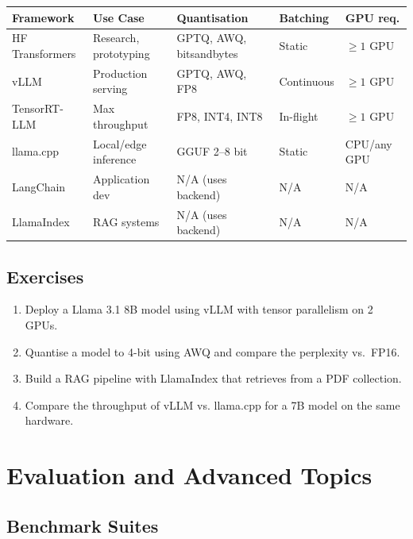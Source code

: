 \documentclass[11pt,a4paper]{book}
\theoremstyle{definition}
\begin{document}
\begin{longtable}{p{3cm}p{3cm}p{3cm}p{3cm}p{3cm}}
	\toprule
	\textbf{Framework} & \textbf{Use Case}     & \textbf{Quantisation}   & \textbf{Batching} & \textbf{GPU req.} \\
	\midrule
	HF Transformers    & Research, prototyping & GPTQ, AWQ, bitsandbytes & Static            & $\geq 1$ GPU      \\
	vLLM               & Production serving    & GPTQ, AWQ, FP8          & Continuous        & $\geq 1$ GPU      \\
	TensorRT-LLM       & Max throughput        & FP8, INT4, INT8         & In-flight         & $\geq 1$ GPU      \\
	llama.cpp          & Local/edge inference  & GGUF 2--8 bit           & Static            & CPU/any GPU       \\
	LangChain          & Application dev       & N/A (uses backend)      & N/A               & N/A               \\
	LlamaIndex         & RAG systems           & N/A (uses backend)      & N/A               & N/A               \\
	\bottomrule
\end{longtable}

\section{Exercises}

\begin{enumerate}
	\item Deploy a Llama 3.1 8B model using vLLM with tensor parallelism on 2 GPUs.
	\item Quantise a model to 4-bit using AWQ and compare the perplexity vs.\ FP16.
	\item Build a RAG pipeline with LlamaIndex that retrieves from a PDF collection.
	\item Compare the throughput of vLLM vs. llama.cpp for a 7B model on the same hardware.
\end{enumerate}

\chapter{Evaluation and Advanced Topics}
\label{ch:evaluation}

\section{Benchmark Suites}
\end{document}
